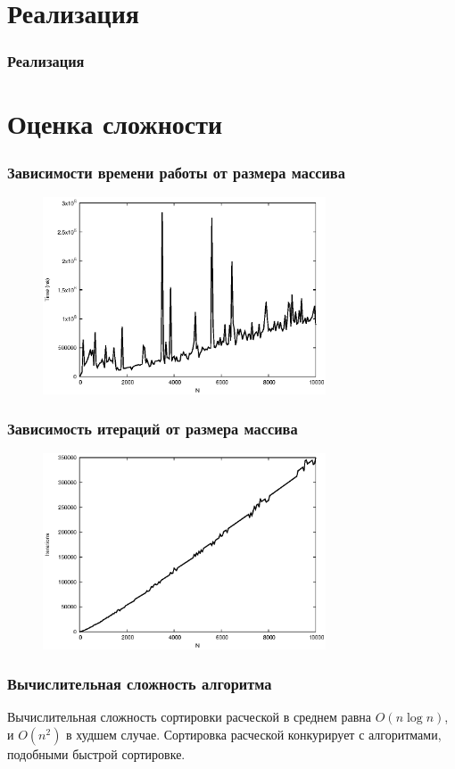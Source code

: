 \documentclass{beamer}
\newcommand{\br}{\pause \linebreak \linebreak}
\begin{document}
\section{Реализация}
\begin{frame}
    \frametitle{Реализация}
    
\end{frame}

\section{Оценка сложности}
\begin{frame}
    \frametitle{Зависимости времени работы от размера массива}
    \begin{figure}
        \center\includegraphics[width=3.3in]{g1}
    \end{figure}
\end{frame}
\begin{frame}
    \frametitle{Зависимость итераций от размера массива}
    \begin{figure}
        \center\includegraphics[width=3.3in]{g2}
    \end{figure}
\end{frame}
\begin{frame}
    \frametitle{Вычислительная сложность алгоритма}
    Вычислительная сложность сортировки расческой в среднем равна $O(n\log{n})$, и $O(n^2)$ в худшем случае.
    \br
    Сортировка расческой конкурирует с алгоритмами, подобными быстрой сортировке.
\end{frame}
\end{document}
